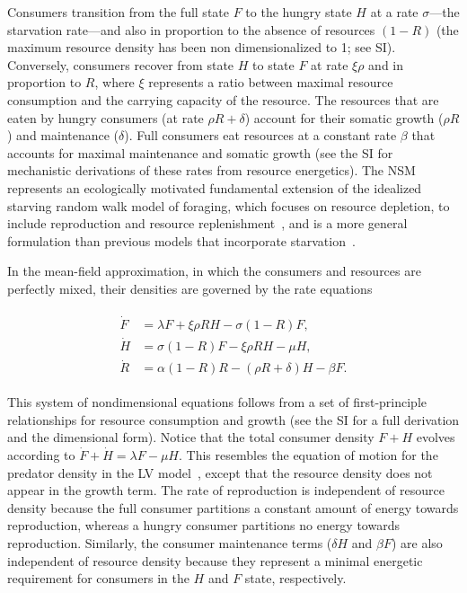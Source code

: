 \documentclass[twocolumn,preprintnumbers,amsmath,amssymb,superscriptaddress]{revtex4}
\begin{document}
\begin{bibunit}[unsrt]
  Consumers transition from the full state $F$ to the hungry state $H$ at a
  rate $\sigma$---the starvation rate---and also in proportion to the absence
  of resources $(1-R)$ (the maximum resource density has been non
  dimensionalized to 1; see SI).  Conversely, consumers recover from state $H$
  to state $F$ at rate $\xi \rho$ and in proportion to $R$, where $\xi$
  represents a ratio between maximal resource consumption and the carrying
  capacity of the resource. %
  The resources that are eaten by hungry consumers (at rate $\rho R + \delta$)
  account for their somatic growth ($\rho R$) and maintenance ($\delta$).  Full
  consumers eat resources at a constant rate $\beta$ that accounts for maximal
  maintenance and somatic growth (see the SI for mechanistic derivations of
  these rates from resource energetics).
  The NSM represents an ecologically motivated fundamental extension of the
  idealized starving random walk model of foraging, which focuses on resource
  depletion, to include reproduction and resource
  replenishment~\citep{Benichou:2014wu,Benichou:2016wl,Chupeau:2016jf}, and is
  a more general formulation than previous models that incorporate
  starvation~\citep{Persson:1998hz}.

  In the mean-field approximation, in which the consumers and resources are
  perfectly mixed, their densities are governed by the rate equations

  \begin{align}
  \label{eq:system}
  \begin{split}
  \dot{F} &= \lambda F + \xi \rho RH - \sigma \left(1-R\right)F,  \\
  \dot{H} &= \sigma \left(1-R\right)F - \xi \rho RH - \mu H,  \\
  \dot{R} &= \alpha \left(1-R\right)R -\left(\rho R+\delta\right)H-\beta F.
  \end{split}
  \end{align}

  This system of nondimensional equations follows from a set of first-principle
  relationships for resource consumption and growth (see the SI for a full derivation and the dimensional form).
  Notice that the total consumer density $F+H$ evolves according to $\dot{F}+\dot{H}=\lambda F-\mu H$.
  This resembles the equation of motion for the predator density in the LV model~\citep{murray2011mathematical}, except that the resource density does not appear in the growth term.
  The rate of reproduction is independent of resource density because the full
  consumer partitions a constant amount of energy towards reproduction, whereas
  a hungry consumer partitions no energy towards reproduction.  Similarly, the
  consumer maintenance terms ($\delta H$ and $\beta F$) are also independent of
  resource density because they represent a minimal energetic requirement for
  consumers in the $H$ and $F$ state, respectively.


\end{bibunit}
\end{document}
